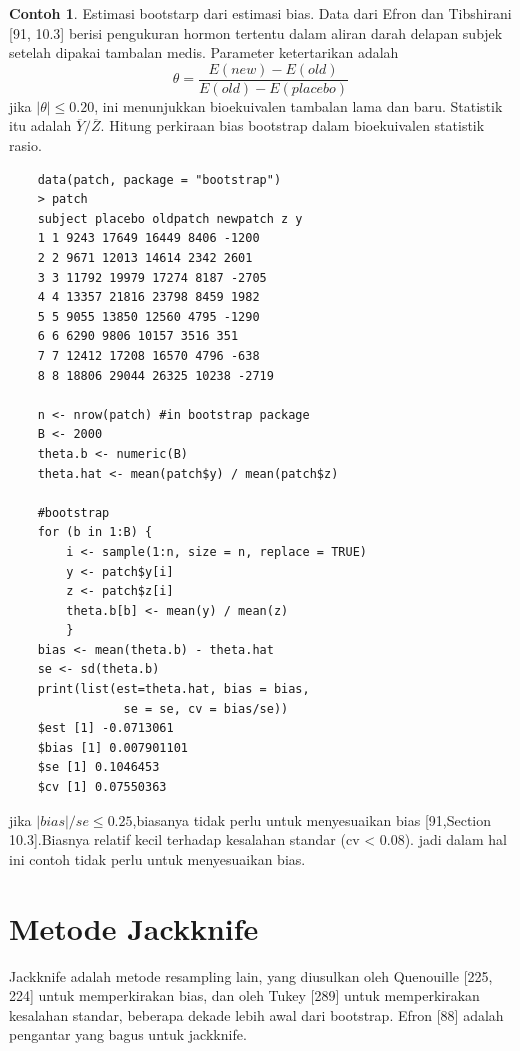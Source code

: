 \documentclass[a4paper,12pt]{article}
\theoremstyle{definition}
\newtheorem{example}{Contoh}[section]
\begin{document}
\begin{example}
    Estimasi bootstarp dari estimasi bias. Data dari Efron dan Tibshirani [91, 10.3] berisi pengukuran hormon tertentu dalam aliran darah delapan subjek setelah dipakai tambalan medis. Parameter ketertarikan adalah
\begin{equation}
    \theta =\frac{E(new)-E(old)}{E(old)-E(placebo)}
\end{equation}
jika $\left | \theta  \right |\leq 0.20$, ini menunjukkan bioekuivalen tambalan lama dan baru. Statistik itu adalah $\overline{Y}/\overline{Z}$. Hitung perkiraan bias bootstrap dalam bioekuivalen
statistik rasio.

\begin{lstlisting}
    data(patch, package = "bootstrap")
    > patch
    subject placebo oldpatch newpatch z y
    1 1 9243 17649 16449 8406 -1200
    2 2 9671 12013 14614 2342 2601
    3 3 11792 19979 17274 8187 -2705
    4 4 13357 21816 23798 8459 1982
    5 5 9055 13850 12560 4795 -1290
    6 6 6290 9806 10157 3516 351
    7 7 12412 17208 16570 4796 -638
    8 8 18806 29044 26325 10238 -2719

    n <- nrow(patch) #in bootstrap package
    B <- 2000
    theta.b <- numeric(B)
    theta.hat <- mean(patch$y) / mean(patch$z)

    #bootstrap
    for (b in 1:B) {
        i <- sample(1:n, size = n, replace = TRUE)
        y <- patch$y[i]
        z <- patch$z[i]
        theta.b[b] <- mean(y) / mean(z)
        }
    bias <- mean(theta.b) - theta.hat
    se <- sd(theta.b)
    print(list(est=theta.hat, bias = bias,
                se = se, cv = bias/se))
    $est [1] -0.0713061
    $bias [1] 0.007901101
    $se [1] 0.1046453
    $cv [1] 0.07550363

\end{lstlisting}
jika $\left | bias \right |/se\leq 0.25$,biasanya  tidak perlu untuk menyesuaikan bias [91,Section 10.3].Biasnya relatif kecil terhadap kesalahan standar (cv < 0.08). jadi dalam hal ini contoh tidak perlu untuk menyesuaikan bias.

\end{example}
\section{Metode Jackknife}
Jackknife adalah metode resampling lain, yang diusulkan oleh Quenouille [225, 224] untuk memperkirakan bias, dan oleh Tukey [289] untuk memperkirakan kesalahan standar, beberapa dekade lebih awal dari bootstrap.  Efron [88] adalah pengantar yang bagus untuk jackknife.
\end{document}
